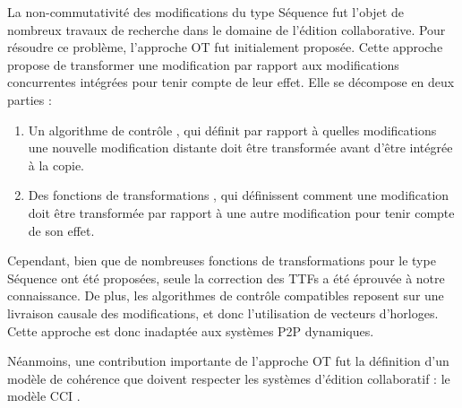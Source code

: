 La non-commutativité des modifications du type Séquence fut l'objet de nombreux travaux de recherche dans le domaine de l'édition collaborative.
Pour résoudre ce problème, l'approche \ac{OT} \cite{1989-grove-ellis-gibbs, 1998-ot-issues-algorithms-achievements-sun} fut initialement proposée.
Cette approche propose de transformer une modification par rapport aux modifications concurrentes intégrées pour tenir compte de leur effet.
Elle se décompose en deux parties :
\begin{enumerate}[label=(\roman*)]
  \item Un algorithme de contrôle \cite{1996-adopted-ressel-nitsch-ruhland-gunzenhauser, 1996-reduce-sun-yang-zhang-chen, 2009-cot-sun}, qui définit par rapport à quelles modifications une nouvelle modification distante doit être transformée avant d'être intégrée à la copie.
  \item Des fonctions de transformations , qui définissent comment une modification doit être transformée par rapport à une autre modification pour tenir compte de son effet.
\end{enumerate}

Cependant, bien que de nombreuses fonctions de transformations pour le type Séquence ont été proposées, seule la correction des \acfp{TTF} \cite{2006-tombstone-transformation-functions-oster} a été éprouvée à notre connaissance.
De plus, les algorithmes de contrôle compatibles reposent sur une livraison causale des modifications, et donc l'utilisation de vecteurs d'horloges.
Cette approche est donc inadaptée aux systèmes \ac{P2P} dynamiques.

Néanmoins, une contribution importante de l'approche \ac{OT} fut la définition d'un modèle de cohérence que doivent respecter les systèmes d'édition collaboratif : le modèle \ac{CCI} \cite{1998-cci-sun}.

